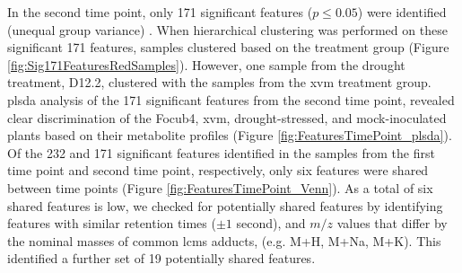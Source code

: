 In the second time point, only 171 significant features ($p \le0.05$) were identified (unequal group variance) . When hierarchical clustering was performed on these significant 171 features, samples clustered based on the treatment group (Figure \ref{fig:Sig171FeaturesRedSamples}). However, one sample from the drought treatment, D12.2, clustered with the samples from the \ac{xvm} treatment group. \Ac{plsda} analysis of the 171 significant features from the second time point, revealed clear discrimination of the \ac{Focub4}, \ac{xvm}, drought-stressed, and mock-inoculated plants based on their metabolite profiles (Figure \ref{fig:FeaturesTimePoint_plsda}). Of the 232 and 171 significant features identified in the samples from the first time point and second time point, respectively, only six features were shared between time points (Figure \ref{fig:FeaturesTimePoint_Venn}). As a total of six shared features is low, we checked for potentially shared features by identifying features with similar retention times ($\pm1$ second), and $m/z$ values that differ by the nominal masses of common \ac{lcms} adducts, (e.g. M+H, M+Na, M+K). This identified a further set of 19 potentially shared features. 



